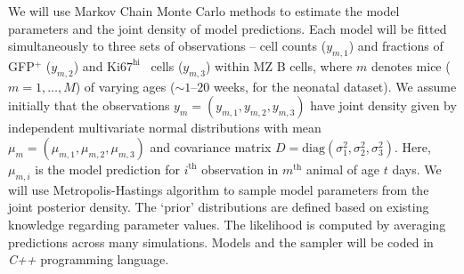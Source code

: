 \documentclass[11pt]{article}
\newcommand{\khi}{\ensuremath{\text{Ki67}^\text{hi}}~}
\begin{document}
We will use  Markov Chain Monte Carlo methods to estimate the model parameters and the joint density of model predictions. %
Each model will be fitted simultaneously to three sets of observations -- cell counts ($y_{m,1}$) and fractions of {GFP$^+$} ($y_{m,2}$) and {\khi} cells ($y_{m,3}$) within MZ B cells, where $m$ denotes mice ($m = 1,\ldots,M$) of varying ages ($\sim1\text{--}20$ weeks, for the neonatal dataset).
We assume initially that the observations $y_{m}=(y_{m,1}, y_{m,2}, y_{m,3})$ have joint density given by independent multivariate normal distributions with mean $\mu_{m}=(\mu_{m,1}, \mu_{m,2}, \mu_{m,3})$ and covariance matrix $D = \text{diag}(\sigma_{1}^{2}, \sigma_{2}^{2}, \sigma_{3}^{2})$.
Here, $\mu_{m, i}$ is the model prediction for  $i^{\text{th}}$ observation in $m^{\text{th}}$ animal of age $t$ days.
We will use Metropolis-Hastings algorithm to sample model parameters from the joint posterior density.
The `prior' distributions are defined based on existing knowledge regarding parameter values.
The likelihood is computed by averaging predictions across many simulations.
Models and the sampler will be coded in \textit{C++} programming language. %
\end{document}
